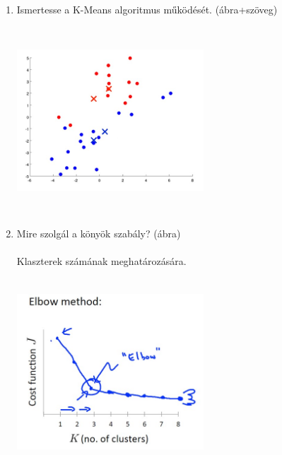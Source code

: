 \documentclass[12pt]{article}
\begin{document}
\begin{enumerate}
\item Ismertesse a K-Means algoritmus működését. (ábra+szöveg)\\
\begin{center}
\includegraphics[width=7cm,height=7cm,keepaspectratio]{./pics/KmeansWorking.jpg}
\end{center}
\newpage
\item Mire szolgál a könyök szabály? (ábra)\\
\\
Klaszterek számának meghatározására.\\
\begin{center}
\includegraphics[width=7cm,height=7cm,keepaspectratio]{./pics/ElbowRule.jpg}
\end{center}


\end{enumerate}
\end{document}

